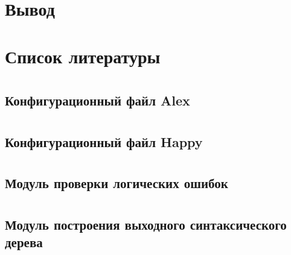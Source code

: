 \documentclass[a4paper,12pt]{report}
\numberwithin{equation}{section}
\begin{document}
\section{Вывод}

\section{Список литературы}
\printbibliography[heading=none]


\section*{} 
\subsection*{Конфигурационный файл Alex}

\clearpage

\section*{} 
\subsection*{Конфигурационный файл Happy}

\clearpage

\section*{} 
\subsection*{Модуль проверки логических ошибок}

\clearpage

\section*{} 
\subsection*{Модуль построения выходного синтаксического дерева}

\clearpage
\end{document}
